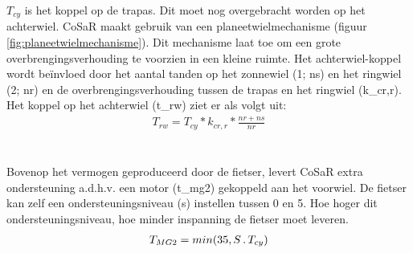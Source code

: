 \noindent $T_{cy}$ is het koppel op de trapas. Dit moet nog overgebracht worden op het achterwiel. CoSaR maakt gebruik van een planeetwielmechanisme (figuur \ref{fig:planeetwielmechanisme}). Dit mechanisme laat toe om een grote overbrengingsverhouding te voorzien in een kleine ruimte. Het achterwiel-koppel wordt beïnvloed door het aantal tanden op het zonnewiel (1; \gls{ns}) en het ringwiel (2; \gls{nr}) en de overbrengingsverhouding tussen de trapas en het ringwiel (\gls{k_cr,r}). Het koppel op het achterwiel (\gls{t_rw}) ziet er als volgt uit:
\begin{gather*}
T_{rw}=T_{cy}*k_{cr,r}*\frac{nr+ns}{nr}
\end{gather*}
\\\\
Bovenop het vermogen geproduceerd door de fietser, levert CoSaR extra ondersteuning a.d.h.v. een motor (\gls{t_mg2}) gekoppeld aan het voorwiel. De fietser kan zelf een ondersteuningsniveau (\gls{s}) instellen tussen 0 en 5. Hoe hoger dit ondersteuningsniveau, hoe minder inspanning de fietser moet leveren. 
\begin{gather*}
T_{MG2}=min(35,S\thinspace .\thinspace T_{cy})
\end{gather*}

